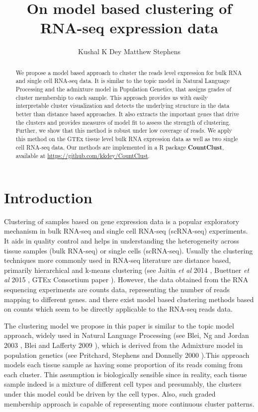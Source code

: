 \title{\Large{\textbf{On model based clustering of RNA-seq expression data}}}
\author{ Kushal K Dey  \qquad Matthew Stephens}

\maketitle

\begin{abstract}
We propose a model based approach to cluster the reads level expression for bulk RNA and single cell RNA-seq data. It is similar to the topic model in Natural Language Processing and the admixture model in Population Genetics, that assigns grades of cluster membership to each sample. This approach provides us with easily interpretable cluster visualization  and  detects the underlying structure in the data better than distance based approaches. It also extracts the important genes that drive the clusters and provides measures of model fit to assess the strength of clustering. Further, we show that this method is robust under low coverage of reads. We apply this method on the GTEx tissue level bulk RNA expression data as well as two single cell RNA-seq data. Our methods are implemented in a R package \textbf{CountClust}, available at \url{https://github.com/kkdey/CountClust}.
\end{abstract}

\section{Introduction}

Clustering of samples based on gene expression data is a popular exploratory mechanism in bulk RNA-seq and single cell RNA-seq (scRNA-seq) experiments. It aids in quality control and helps in understanding the heterogeneity across tissue samples (bulk RNA-seq) or single cells (scRNA-seq). Usually the clustering techniques more commonly used in RNA-seq literature are distance based, primarily hierarchical and k-means clustering (see Jaitin \textit{et al} 2014 \cite{Jaitin2014}, Buettner \textit{et al} 2015 \cite{Buettner2015}, GTEx Consortium paper \cite{GTEX2013}). However, the data obtained from the RNA sequencing experiments are counts data, representing the number of reads mapping to different genes. and there exist model based clustering methods based on counts which seem to be directly applicable to the RNA-seq reads data.  

The clustering model we propose in this paper is similar to the topic model approach, widely used in Natural Language Processing (see Blei, Ng and Jordan 2003 \cite{Blei2003}, Blei and Lafferty 2009 \cite{Blei2009}), which is derived from the Admixture model in population genetics (see Pritchard, Stephens and Donnelly 2000 \cite{Pritchard2000}).This approach models each tissue sample as having some proportion of its reads coming from each cluster. This assumption is biologically sensible since in reality, each tissue sample indeed is a mixture of different cell types and presumably, the clusters under this model could be driven by the cell types. Also, such graded membership approach is capable of representing more continuous cluster patterns. 

